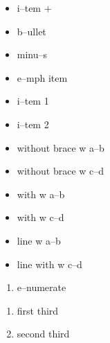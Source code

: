 \documentclass{book}
\begin{document}
\begin{itemize}[label=+]
\item i--tem +
\end{itemize}

\begin{itemize}[label=\textbullet{}]
\item b--ullet
\end{itemize}

\begin{itemize}[label=-]
\item minu--s
\end{itemize}

\begin{itemize}[label=\emph{after emph}]
\item e--mph item
\end{itemize}

\begin{itemize}[label=\textbullet{} a--n itemize line]
\item {}%
i--tem 1
\item i--tem 2
\end{itemize}

\begin{itemize}[label={}]
\item without brace w a--b
\item without brace w c--d
\end{itemize}

\begin{itemize}[label={}]
\item with w a--b
\item with w c--d
\end{itemize}

\begin{itemize}[label=\hbox{} on a line]
\item line w a--b
\item line with w c--d
\end{itemize}

\begin{enumerate}[start=1]
\item e--numerate
\end{enumerate}

\begin{enumerate}[start=3]
\item first third
\item second third
\end{enumerate}
\end{document}
